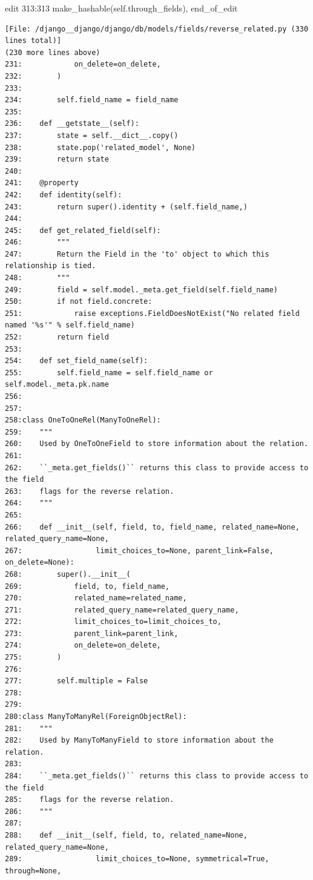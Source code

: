 {\begin{agentbox}
\hrulefill
\begin{CodeVerbatim}[breaklines=true, breakanywhere=true]
edit 313:313
            make_hashable(self.through_fields),
end_of_edit
\end{CodeVerbatim}
\end{agentbox}
\begin{observationbox}\begin{Verbatim}[breaklines=true, breakanywhere=true]
[File: /django__django/django/db/models/fields/reverse_related.py (330 lines total)]
(230 more lines above)
231:            on_delete=on_delete,
232:        )
233:
234:        self.field_name = field_name
235:
236:    def __getstate__(self):
237:        state = self.__dict__.copy()
238:        state.pop('related_model', None)
239:        return state
240:
241:    @property
242:    def identity(self):
243:        return super().identity + (self.field_name,)
244:
245:    def get_related_field(self):
246:        """
247:        Return the Field in the 'to' object to which this relationship is tied.
248:        """
249:        field = self.model._meta.get_field(self.field_name)
250:        if not field.concrete:
251:            raise exceptions.FieldDoesNotExist("No related field named '%s'" % self.field_name)
252:        return field
253:
254:    def set_field_name(self):
255:        self.field_name = self.field_name or self.model._meta.pk.name
256:
257:
258:class OneToOneRel(ManyToOneRel):
259:    """
260:    Used by OneToOneField to store information about the relation.
261:
262:    ``_meta.get_fields()`` returns this class to provide access to the field
263:    flags for the reverse relation.
264:    """
265:
266:    def __init__(self, field, to, field_name, related_name=None, related_query_name=None,
267:                 limit_choices_to=None, parent_link=False, on_delete=None):
268:        super().__init__(
269:            field, to, field_name,
270:            related_name=related_name,
271:            related_query_name=related_query_name,
272:            limit_choices_to=limit_choices_to,
273:            parent_link=parent_link,
274:            on_delete=on_delete,
275:        )
276:
277:        self.multiple = False
278:
279:
280:class ManyToManyRel(ForeignObjectRel):
281:    """
282:    Used by ManyToManyField to store information about the relation.
283:
284:    ``_meta.get_fields()`` returns this class to provide access to the field
285:    flags for the reverse relation.
286:    """
287:
288:    def __init__(self, field, to, related_name=None, related_query_name=None,
289:                 limit_choices_to=None, symmetrical=True, through=None,

\end{Verbatim}
\end{observationbox}}
